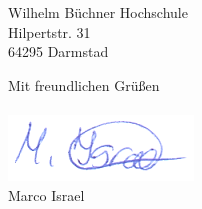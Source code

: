 \documentclass[
    version=last,           %
    DIV=13,                 %
    BCOR=0mm,               %
    paper=a4,               %
    fontsize=12pt,          %
    firsthead=on,           %
    firstfoot=on,           %
    pagenumber=on,i         %
    parskip=half,           %
    enlargefirstpage=,      %
    firsthead=on,           %
    fromrule=afteraddress,  %
    priority=off,           %
    backaddress=true,       %
    refline=dateright,      %
	fromalign=right,	    %
    fromemail=on,i          %
    fromurl=on,             %
    frombank=on,
    fromphone=on,           %
    frommobilephone=on      %
    fromlogo=on,            %
    addrfield=on,           %
    subject=untitled,  %
    foldmarks=off,          %
    numericaldate=off,      %
	pagenumber=right,	        %
	parskip=half,	        %
    headsep=false,          %
    footsepline=true,       %
    foldmarks=off,		    %
	]{scrlttr2}
\begin{document}
\begin{letter} {Wilhelm Büchner Hochschule \\
Hilpertstr. 31\\
64295 Darmstad}
\begin{itemize}
\begin{enumerate}
        \end{enumerate}
\end{itemize}
\vspace{1cm}
Mit freundlichen Grüßen \\
\\
    \includegraphics[scale=0.70]{../unterschrift.png}
    \\
    Marco Israel




%





\end{letter}
\end{document}
